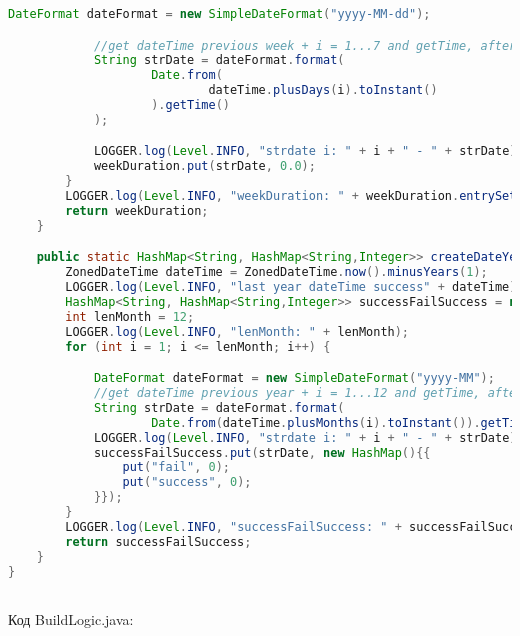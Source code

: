 \begin{lstlisting}[language=Java]
            DateFormat dateFormat = new SimpleDateFormat("yyyy-MM-dd");

            //get dateTime previous week + i = 1...7 and getTime, after in strDate=2022-03-01
            String strDate = dateFormat.format(
                    Date.from(
                            dateTime.plusDays(i).toInstant()
                    ).getTime()
            );

            LOGGER.log(Level.INFO, "strdate i: " + i + " - " + strDate);
            weekDuration.put(strDate, 0.0);
        }
        LOGGER.log(Level.INFO, "weekDuration: " + weekDuration.entrySet());
        return weekDuration;
    }

    public static HashMap<String, HashMap<String,Integer>> createDateYearMapSuccessRate() {
        ZonedDateTime dateTime = ZonedDateTime.now().minusYears(1);
        LOGGER.log(Level.INFO, "last year dateTime success" + dateTime);
        HashMap<String, HashMap<String,Integer>> successFailSuccess = new HashMap();
        int lenMonth = 12;
        LOGGER.log(Level.INFO, "lenMonth: " + lenMonth);
        for (int i = 1; i <= lenMonth; i++) {

            DateFormat dateFormat = new SimpleDateFormat("yyyy-MM");
            //get dateTime previous year + i = 1...12 and getTime, after in strDate=2022-03
            String strDate = dateFormat.format(
                    Date.from(dateTime.plusMonths(i).toInstant()).getTime());
            LOGGER.log(Level.INFO, "strdate i: " + i + " - " + strDate);
            successFailSuccess.put(strDate, new HashMap(){{
                put("fail", 0);
                put("success", 0);
            }});
        }
        LOGGER.log(Level.INFO, "successFailSuccess: " + successFailSuccess.entrySet());
        return successFailSuccess;
    }
}



\end{lstlisting}

Код BuildLogic.java:

